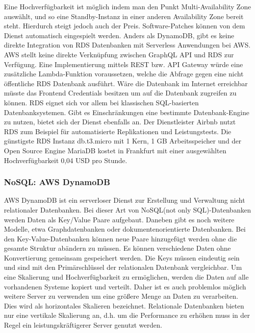 Eine Hochverfügbarkeit ist möglich indem man den Punkt Multi-Availability Zone auswählt, und so eine Standby-Instanz in einer anderen
Availability Zone bereit steht. Hierdurch steigt jedoch auch der Preis. Software-Patches können von dem Dienst automatisch eingespielt werden.
Anders als DynamoDB, gibt es keine direkte Integration von RDS Datenbanken mit Serverless Anwendungen bei AWS.
AWS stellt keine direkte Verknüpfung zwischen GraphQL API und RDS zur Verfügung. Eine Implementierung mittels REST bzw. API Gateway würde eine zusätzliche Lambda-Funktion voraussetzen, welche
die Abfrage gegen eine nicht öffentliche RDS Datenbank ausführt. Wäre die Datenbank im Internet erreichbar müsste das Frontend Credentials besitzen um auf die Datenbank zugreifen zu können.
RDS eignet sich vor allem bei klassischen SQL-basierten Datenbanksystemen. Gibt es Einschränkungen eine bestimmte Datenbank-Engine zu nutzen, bietet sich der Dienst ebenfalls an.
Der Dienstleister Airbnb nutzt RDS zum Beispiel für automatisierte Replikationen und Leistungstests.
Die günstigste RDS Instanz \glqq db.t3.micro\grqq{} mit 1 Kern, 1 GB Arbeitsspeicher und der Open Source Engine MariaDB kostet in Frankfurt mit einer ausgewählten Hochverfügbarkeit 0,04 USD pro Stunde. \cite[]{RDS}


\subsubsection{NoSQL: AWS DynamoDB}
\label{DynamoDB}

AWS DynamoDB ist ein serverloser Dienst zur Erstellung und Verwaltung nicht relationaler Datenbanken.
Bei dieser Art von NoSQL(not only SQL)-Datenbanken werden Daten als Key/Value Paare aufgebaut. Daneben gibt es noch weitere Modelle, etwa Graphdatenbanken oder dokumentenorientierte
Datenbanken.
Bei den Key-Value-Datenbanken können neue Paare hinzugefügt werden ohne die gesamte Struktur abändern zu müssen. Es können verschiedene Daten ohne Konvertierung gemeinsam
gespeichert werden.
Die Keys müssen eindeutig sein und sind mit den Primärschlüssel der relationalen Datenbank vergleichbar.
Um eine Skalierung und Hochverfügbarkeit zu ermöglichen, werden die Daten auf alle vorhandenen Systeme kopiert und verteilt. Daher ist es auch problemlos möglich weitere
Server zu verwenden um eine größere Menge an Daten zu verarbeiten. Dies wird als horizontales Skalieren bezeichnet.
Relationale Datenbanken bieten nur eine vertikale Skalierung an, d.h. um die Performance zu erhöhen muss in der Regel ein leistungskräftigerer Server genutzt werden.

